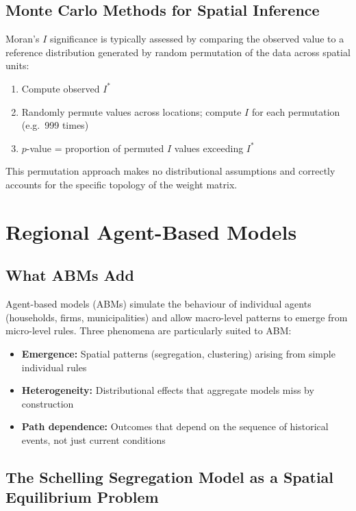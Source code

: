 \subsection{Monte Carlo Methods for Spatial Inference}

Moran's $I$ significance is typically assessed by comparing the observed
value to a reference distribution generated by random permutation of the
data across spatial units:
\begin{enumerate}
  \item Compute observed $I^*$
  \item Randomly permute values across locations; compute $I$ for each
    permutation (e.g.\ 999 times)
  \item $p$-value = proportion of permuted $I$ values exceeding $I^*$
\end{enumerate}

This permutation approach makes no distributional assumptions and correctly
accounts for the specific topology of the weight matrix.


\section{Regional Agent-Based Models}
\label{sec_ABMs}

\subsection{What ABMs Add}

Agent-based models (ABMs) simulate the behaviour
of individual agents (households, firms, municipalities) and allow macro-level
patterns to emerge from micro-level rules. Three phenomena are particularly
suited to ABM:

\begin{itemize}
  \item \textbf{Emergence:} Spatial patterns (segregation, clustering)
    arising from simple individual rules
  \item \textbf{Heterogeneity:} Distributional effects that aggregate models
    miss by construction
  \item \textbf{Path dependence:} Outcomes that depend on the sequence of
    historical events, not just current conditions
\end{itemize}

\subsection{The Schelling Segregation Model as a Spatial Equilibrium Problem}

